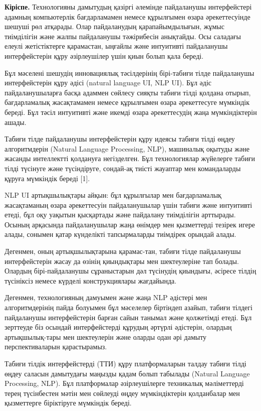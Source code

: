 \begin{multicols}{2}
{\bfseries Кіріспе.} Технологияны дамытудың қазіргі әлемінде пайдаланушы
интерфейстері адамның компьютерлік бағдарламамен немесе құрылғымен өзара
әрекеттесуінде шешуші рөл атқарады. Олар пайдаланудың қарапайымдылығын,
жұмыс тиімділігін және жалпы пайдаланушы тәжірибесін анықтайды. Осы
саладағы елеулі жетістіктерге қарамастан, ыңғайлы және интуитивті
пайдаланушы интерфейстерін құру әзірлеушілер үшін қиын болып қала
береді.

Бұл мәселені шешудің инновациялық тәсілдерінің бірі-табиғи тілде
пайдаланушы интерфейстерін құру әдісі (natural language UI, NLP UI). Бұл
әдіс пайдаланушыларға басқа адаммен сөйлесу сияқты табиғи тілді қолдана
отырып, бағдарламалық жасақтамамен немесе құрылғымен өзара әрекеттесуге
мүмкіндік береді. Бұл тәсіл интуитивті және икемді өзара әрекеттесудің
жаңа мүмкіндіктерін ашады.

Табиғи тілде пайдаланушы интерфейстерін құру идеясы табиғи тілді өңдеу
алгоритмдерін (Natural Language Processing, NLP), машиналық оқытуды және
жасанды интеллектті қолдануға негізделген. Бұл технологиялар жүйелерге
табиғи тілді түсінуге және түсіндіруге, сондай-ақ тиісті жауаптар мен
командаларды құруға мүмкіндік береді {[}1{]}.

NLP UI артықшылықтары айқын: бұл құрылғылар мен бағдарламалық
жасақтаманың өзара әрекеттесуін пайдаланушылар үшін табиғи және
интуитивті етеді, бұл оқу уақытын қысқартады және пайдалану тиімділігін
арттырады. Осының арқасында пайдаланушылар жаңа өнімдер мен қызметтерді
тезірек игере алады, сонымен қатар күнделікті тапсырмаларды тиімдірек
орындай алады.

Дегенмен, оның артықшылықтарына қарамас-тан, табиғи тілде пайдаланушы
интерфейстерін жасау да өзінің қиындықтары мен шектеулеріне тап болады.
Олардың бірі-пайдаланушы сұраныстарын дәл түсінудің қиындығы, әсіресе
тілдің түсініксіз немесе күрделі конструкциялары жағдайында.

Дегенмен, технологияның дамуымен және жаңа NLP әдістері мен
алгоритмдерінің пайда болуымен бұл мәселелер біртіндеп азайып, табиғи
тілдегі пайдаланушы интерфейстерін барған сайын танымал және қолжетімді
етеді. Бұл зерттеуде біз осындай интерфейстерді құрудың әртүрлі
әдістерін, олардың артықшылық-тары мен шектеулерін және оларды одан әрі
дамыту перспективаларын қарастырамыз.

Табиғи тілдік интерфейстерді (ТТИ) құру платформаларын талдау табиғи
тілді өңдеу саласын дамытудағы маңызды қадам болып табылады (Natural
Language Processing, NLP). Бұл платформалар әзірлеушілерге техникалық
мәліметтерді терең түсінбестен мәтін мен сөйлеуді өңдеу мүмкіндіктерін
қолданбалар мен қызметтерге біріктіруге мүмкіндік береді.


\end{multicols}

